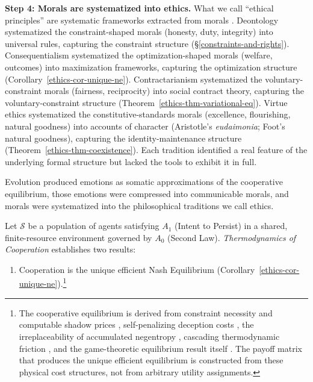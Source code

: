 \documentclass[11pt]{article}
\theoremstyle{plain}
\theoremstyle{definition}
\theoremstyle{remark}
\providecommand{\tightlist}{%
  \setlength{\itemsep}{0pt}\setlength{\parskip}{0pt}}
\begin{document}
\textbf{Step 4: Morals are systematized into ethics.} What we call
``ethical principles'' are systematic frameworks extracted from morals
\citep{Rawls1971, Haidt2012}. Deontology systematized the
constraint-shaped morals (honesty, duty, integrity) into universal
rules, capturing the constraint structure
(§\ref{constraints-and-rights}). Consequentialism systematized the
optimization-shaped morals (welfare, outcomes) into maximization
frameworks, capturing the optimization structure
(Corollary~\ref{ethics-cor-unique-ne}). Contractarianism systematized
the voluntary-constraint morals (fairness, reciprocity) into social
contract theory, capturing the voluntary-constraint structure
(Theorem~\ref{ethics-thm-variational-eq}). Virtue ethics systematized
the constitutive-standards morals (excellence, flourishing, natural
goodness) into accounts of character (Aristotle's \emph{eudaimonia};
Foot's natural goodness), capturing the identity-maintenance structure
(Theorem~\ref{ethics-thm-coexistence}). Each tradition identified a real
feature of the underlying formal structure but lacked the tools to
exhibit it in full.

Evolution produced emotions as somatic approximations of the cooperative
equilibrium, those emotions were compressed into communicable morals,
and morals were systematized into the philosophical traditions we call
ethics.

Let \(\mathcal{S}\) be a population of agents satisfying \(A_1\) (Intent
to Persist) in a shared, finite-resource environment governed by \(A_0\)
(Second Law). \emph{Thermodynamics of Cooperation} establishes two
results:

\begin{enumerate}
\def\labelenumi{(\roman{enumi})}
\tightlist
\item
  Cooperation is the unique efficient Nash Equilibrium
  (Corollary~\ref{ethics-cor-unique-ne}).\footnote{The cooperative
    equilibrium is derived from constraint necessity and computable
    shadow prices \citep{TC-I}, self-penalizing deception costs
    \citep{TC-II}, the irreplaceability of accumulated negentropy
    \citep{TC-III}, cascading thermodynamic friction \citep{TC-IV}, and
    the game-theoretic equilibrium result itself \citep{TC-V}. The
    payoff matrix that produces the unique efficient equilibrium is
    constructed from these physical cost structures, not from arbitrary
    utility assignments.}
\end{enumerate}
\end{document}
